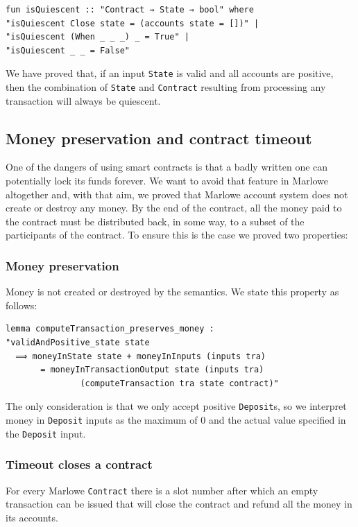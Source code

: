 \documentclass[runningheads]{llncs}
\begin{document}
\begin{verbatim}
fun isQuiescent :: "Contract ⇒ State ⇒ bool" where
"isQuiescent Close state = (accounts state = [])" |
"isQuiescent (When _ _ _) _ = True" |
"isQuiescent _ _ = False"
\end{verbatim}
\noindent
We have proved that, if an input \texttt{State} is valid and all accounts are positive, then the combination of \texttt{State} and \texttt{Contract} resulting from processing any transaction will always be quiescent.

\subsection{Money preservation and contract timeout}

One of the dangers of using smart contracts is that a badly written one can potentially lock its funds forever. We want to avoid that feature in Marlowe altogether and, with that aim, we proved that Marlowe account system does not create or destroy any money. By the end of the contract, all the money paid to the contract must be distributed back, in some way, to a subset of the participants of the contract.
To ensure this is the case we proved two properties:

\subsubsection{Money preservation}
Money is not created or destroyed by the semantics. We state this property as follows:

\begin{verbatim}
lemma computeTransaction_preserves_money :
"validAndPositive_state state
  ⟹ moneyInState state + moneyInInputs (inputs tra)
       = moneyInTransactionOutput state (inputs tra)
               (computeTransaction tra state contract)"
\end{verbatim}
\noindent
The only consideration is that we only accept positive \texttt{Deposit}s, so we interpret money in \texttt{Deposit} inputs as the maximum of $0$ and the actual value specified in the \texttt{Deposit} input.

\subsubsection{Timeout closes a contract}

For every Marlowe \texttt{Contract} there is a slot number after which an empty transaction can be issued that will close the contract and refund all the money in its accounts.
\end{document}
